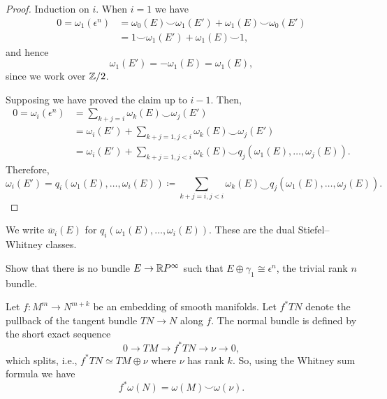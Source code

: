 \documentclass[ma3408.tex]{subfiles}
\begin{document}
\begin{proof}
Induction on $i$. When $i = 1$ we have
\[
\begin{split}
0 = \omega_1(\epsilon^n) &= \omega_0(E) \smile \omega_1(E')+ \omega_1(E) \smile \omega_0(E')\\
&=  1 \smile \omega_1(E') + \omega_1(E) \smile 1,
\end{split}
\]
and hence 
\[
\omega_1(E') = -\omega_1(E) = \omega_1(E),
\]
since we work over $\mathbb{Z}/2$. 

Supposing we have proved the claim up to $i-1$. Then,
\[
\begin{split}
0 = \omega_i(\epsilon^n) &= \sum_{k+j=i} \omega_k(E) \smile \omega_j(E') \\
&= \omega_i(E') + \sum_{k+j=1, j < i} \omega_k(E) \smile \omega_j(E') \\
& = \omega_i(E') + \sum_{k+j=1, j < i} \omega_k(E) \smile q_j(\omega_1(E),\ldots,\omega_j(E)).
\end{split}
\]
Therefore,
\[
\omega_i(E') = q_i(\omega_1(E),\ldots,\omega_i(E)) \coloneqq \sum_{k+j=i,j<i} \omega_k(E) \smile q_j(\omega_1(E),\ldots,\omega_j(E)).
\]
\end{proof}
\begin{Def}
We write $\overline{w}_i(E)$ for $q_i(\omega_1(E),\ldots,\omega_i(E))$. These are the dual Stiefel--Whitney classes.
\end{Def}
\begin{exercise}
Show that there is no bundle $E \to \mathbb{R} P^{\infty}$ such that $E \oplus \gamma_1 \cong \epsilon^n$, the trivial rank $n$ bundle.
\end{exercise}
\begin{Rem}
Let $f \colon M^{m} \to N^{m+k}$ be an embedding of smooth manifolds. Let $f^*TN$ denote the pullback of the tangent bundle $TN \to N$ along $f$. The normal bundle is defined by the short exact sequence 
\[
0 \to TM \to f^*TN \to \nu \to 0,
\]
which splits, i.e., $f^*TN \simeq TM \oplus \nu$ where $\nu$ has rank $k$. So, using the Whitney sum formula we have
\[
f^*\omega(N)= \omega(M) \smile \omega(\nu). 
\]
\end{Rem}
\end{document}
